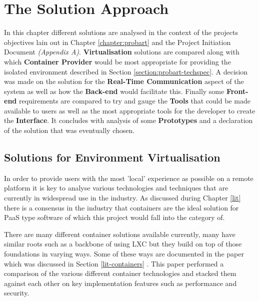 \chapter{The Solution Approach} \label{solapp}

In this chapter different solutions are analysed in the context of the projects objectives lain out in Chapter \ref{chapter:probart} and the Project Initiation Document \textit{(Appendix A)}. \textbf{Virtualisation} solutions are compared along with which \textbf{Container Provider} would be most appropriate for providing the isolated environment described in Section \ref{section:probart-techspec}. A decision was made on the solution for the \textbf{Real-Time Communication} aspect of the system as well as how the \textbf{Back-end} would facilitate this. Finally some \textbf{Front-end} requirements are compared to try and gauge the \textbf{Tools} that could be made available to users as well as the most appropriate tools for the developer to create the \textbf{Interface}. It concludes with analysis of some \textbf{Prototypes} and a declaration of the solution that was eventually chosen.

\section{Solutions for Environment Virtualisation} \label{subapp-virt}
In order to provide users with the most 'local' experience as possible on a remote platform it is key to analyse various technologies and techniques that are currently in widespread use in the industry. As discussed during Chapter \ref{lit} there is a consensus in the industry that containers are the ideal solution for PaaS type software of which this project would fall into the category of.

There are many different container solutions available currently, many have similar roots such as a backbone of using LXC but they build on top of those foundations in varying ways. Some of these ways are documented in the paper which was discussed in Section \ref{lit-containers} \cite{contsvsvirt}. This paper performed a comparison of the various different container technologies and stacked them against each other on key implementation features such as performance and security.

